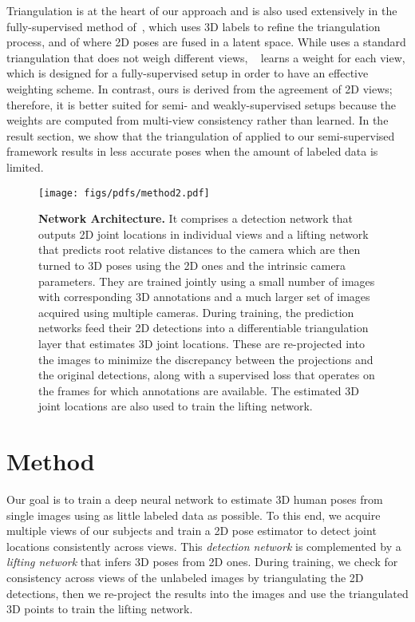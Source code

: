 \documentclass[runningheads]{llncs}
\begin{document}
Triangulation is at the heart of our approach and is also used extensively in the fully-supervised method of~\cite{Iskakov19}, which uses 3D labels to refine the triangulation process, and of \cite{Remelli20a} where 2D poses are fused in a latent space. While \cite{Remelli20a} uses a standard triangulation that does not weigh different views, ~\cite{Iskakov19} learns a weight for each view, which is designed for a fully-supervised setup in order to have an effective weighting scheme. In contrast, ours is derived from the agreement of 2D views; therefore, it is better suited for semi- and weakly-supervised setups because the weights are computed from multi-view consistency rather than learned. In the result section, we show that the triangulation of \cite{Iskakov19} applied to our semi-supervised framework results in less accurate poses when the amount of labeled data is limited. 

\begin{figure*}[!t]
    \begin{center}
    \texttt{[image: figs/pdfs/method2.pdf]} \end{center}
    \vspace{-5mm}
    \caption{\small {\bf Network Architecture.} It comprises a detection network that outputs 2D joint locations in individual views and a lifting network that predicts root relative distances 
    to the camera which are then turned to 3D poses using the 2D ones and the intrinsic camera parameters. They are trained jointly using a small number of images with corresponding 3D annotations and a much larger set of images acquired using multiple cameras. During training, the prediction networks feed their 2D detections into a differentiable triangulation layer that estimates 3D joint locations. These are re-projected into the images to minimize the discrepancy between the projections and the original detections, along with a supervised loss that operates on the frames for which annotations are available. The estimated 3D joint locations are also used to train the lifting network.}
    \label{fig:arch}
\end{figure*} 
\section{Method}
\label{sec:method}

Our goal is to train a deep neural network to estimate 3D human poses from single images using as little labeled data as possible. 
To this end, we acquire multiple views of our subjects and train a 2D pose estimator to detect joint locations consistently across views.
This {\it detection network} is complemented by a {\it lifting network} that infers 3D poses from 2D ones. 
During training, we check for consistency across views of the unlabeled images by triangulating the 2D detections, then we re-project the results into the images and use the triangulated 3D points to train the lifting network. 
\end{document}
